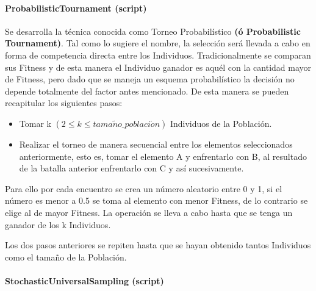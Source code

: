 \documentclass[class=report, crop=false]{standalone}
\begin{document}
\paragraph{ProbabilisticTournament (script)}
\label{sec:a_2_4_1_2}

\begin{fulllineitems}

\begin{DUlineblock}{0em}
\item[] Se desarrolla la técnica conocida como Torneo 
Probabilístico \textbf{(ó Probabilistic Tournament)}.\break
Tal como lo sugiere el nombre, la selección será 
llevada a cabo en forma de competencia directa 
entre los Individuos.\break
Tradicionalmente se comparan sus Fitness y de esta 
manera el Individuo ganador es aquél con la cantidad 
mayor de Fitness, pero dado que se maneja un esquema 
probabilístico la decisión no depende totalmente del 
factor antes mencionado.\medskip\break
De esta manera se pueden recapitular los siguientes pasos:

\begin{itemize}
\item Tomar k \((2 \leqslant k \leqslant tama\tilde{n}o\_poblaci\acute{o}n)\) Individuos de la Población.
\item Realizar el torneo de manera secuencial entre los elementos seleccionados anteriormente, esto es, tomar el elemento A y enfrentarlo con B, al resultado de la batalla anterior enfrentarlo con C y así sucesivamente.
\end{itemize}

Para ello por cada encuentro se crea un número aleatorio 
entre 0 y 1, si el número es menor a 0.5 se toma al elemento 
con menor Fitness, de lo contrario se elige al de mayor 
Fitness.\break
La operación se lleva a cabo hasta que se tenga un ganador 
de los k Individuos.

Los dos pasos anteriores se repiten hasta que se hayan obtenido 
tantos Individuos como el tamaño de la Población.
\end{DUlineblock}

\end{fulllineitems}

\paragraph{StochasticUniversalSampling (script)}
\label{sec:a_2_4_1_3}
\end{document}
